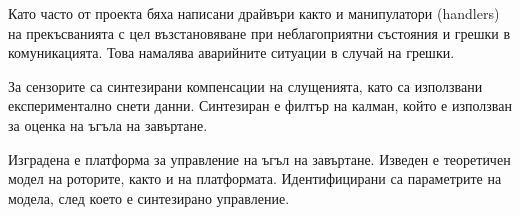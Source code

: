 Като часто от проекта бяха написани драйвъри както и манипулатори (handlers) на прекъсванията с цел възстановяване при
неблагоприятни състояния и грешки в комуникацията. Това намалява аварийните ситуации в случай на грешки.

За сензорите са синтезирани компенсации на слущенията, като са използвани експериментално снети данни.
Синтезиран е филтър на калман, който е използван за оценка на ъгъла на завъртане.

Изградена е платформа за управление на ъгъл на завъртане. Изведен е теоретичен модел на роторите, както и на платформата.
Идентифицирани са параметрите на модела, след което е синтезирано управление.
